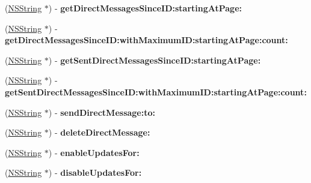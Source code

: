 \begin{DoxyCompactItemize}
\item 
\hypertarget{interface_m_g_twitter_engine_aaf576a2b307d113b22922bf8f10dfb7e}{
(\hyperlink{class_n_s_string}{\-N\-S\-String} $\ast$) -\/ {\bfseries get\-Direct\-Messages\-Since\-I\-D\-:starting\-At\-Page\-:}}
\label{interface_m_g_twitter_engine_aaf576a2b307d113b22922bf8f10dfb7e}

\item 
\hypertarget{interface_m_g_twitter_engine_ad140175bf45e9d41001edf80390e850f}{
(\hyperlink{class_n_s_string}{\-N\-S\-String} $\ast$) -\/ {\bfseries get\-Direct\-Messages\-Since\-I\-D\-:with\-Maximum\-I\-D\-:starting\-At\-Page\-:count\-:}}
\label{interface_m_g_twitter_engine_ad140175bf45e9d41001edf80390e850f}

\item 
\hypertarget{interface_m_g_twitter_engine_a2673daf8b082b440ceb04e2044dc5963}{
(\hyperlink{class_n_s_string}{\-N\-S\-String} $\ast$) -\/ {\bfseries get\-Sent\-Direct\-Messages\-Since\-I\-D\-:starting\-At\-Page\-:}}
\label{interface_m_g_twitter_engine_a2673daf8b082b440ceb04e2044dc5963}

\item 
\hypertarget{interface_m_g_twitter_engine_ae16fe04b969e44769d2939f682f94eae}{
(\hyperlink{class_n_s_string}{\-N\-S\-String} $\ast$) -\/ {\bfseries get\-Sent\-Direct\-Messages\-Since\-I\-D\-:with\-Maximum\-I\-D\-:starting\-At\-Page\-:count\-:}}
\label{interface_m_g_twitter_engine_ae16fe04b969e44769d2939f682f94eae}

\item 
\hypertarget{interface_m_g_twitter_engine_a186e34a3636693d8b2a1dfd4a83bcd16}{
(\hyperlink{class_n_s_string}{\-N\-S\-String} $\ast$) -\/ {\bfseries send\-Direct\-Message\-:to\-:}}
\label{interface_m_g_twitter_engine_a186e34a3636693d8b2a1dfd4a83bcd16}

\item 
\hypertarget{interface_m_g_twitter_engine_addaacdd1ca2dd3fadb581bd56e9a80ea}{
(\hyperlink{class_n_s_string}{\-N\-S\-String} $\ast$) -\/ {\bfseries delete\-Direct\-Message\-:}}
\label{interface_m_g_twitter_engine_addaacdd1ca2dd3fadb581bd56e9a80ea}

\item 
\hypertarget{interface_m_g_twitter_engine_a1624a69c9bd1dcd22f57aa3e6ee0fac0}{
(\hyperlink{class_n_s_string}{\-N\-S\-String} $\ast$) -\/ {\bfseries enable\-Updates\-For\-:}}
\label{interface_m_g_twitter_engine_a1624a69c9bd1dcd22f57aa3e6ee0fac0}

\item 
\hypertarget{interface_m_g_twitter_engine_a5524857888e13e7efd9f71fc0a7e31cc}{
(\hyperlink{class_n_s_string}{\-N\-S\-String} $\ast$) -\/ {\bfseries disable\-Updates\-For\-:}}
\label{interface_m_g_twitter_engine_a5524857888e13e7efd9f71fc0a7e31cc}


\end{DoxyCompactItemize}
